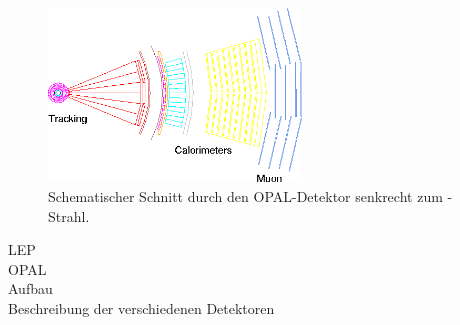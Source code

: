 \begin{figure}[H]
\begin{center}
  \includegraphics[width=0.6\textwidth]{../img/opalslice_tr.png}
  \caption{Schematischer Schnitt durch den OPAL-Detektor senkrecht zum \mbox{\ee-Strahl}\protect\footnotemark.}
  \label{img:schnitt}
\end{center}
\end{figure} 

LEP\\
OPAL \\
Aufbau \\
Beschreibung der verschiedenen Detektoren 
